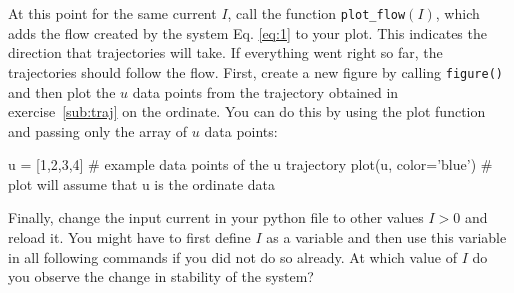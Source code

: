 \documentclass[12pt]{article}
\begin{document}
\begin{Exercise}[title=Python phase plane analysis]
\Question At this point for the same current $I$, call the function \verb|plot_flow|$(I)$, which adds the flow created by the system Eq. \ref{eq:1} to your plot. This indicates the direction that trajectories will take. If everything went right so far, the trajectories should follow the flow.
\Question First, create a new figure by calling \verb|figure()| and then plot the $u$ data points from the trajectory obtained in exercise~\ref{sub:traj} on the ordinate. You can do this by using the plot function and passing only the array of $u$ data points:
\begin{code}
u = [1,2,3,4] # example data points of the u trajectory
plot(u, color='blue') # plot will assume that u is the ordinate data 
\end{code}
\Question \label{big} Finally, change the input current in your python file to other values $I>0$ and reload it. You might have to first define $I$ as a variable and then use this variable in all following commands if you did not do so already. At which value of $I$ do you observe the change in stability of the system?

\end{Exercise}
\end{document}
